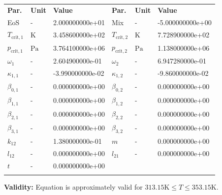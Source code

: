 \begin{longtable}[l]{lll|lll}
\toprule
\addlinespace
\textbf{Par.} & \textbf{Unit} & \textbf{Value} &	\textbf{Par.} & \textbf{Unit} & \textbf{Value} \\
\addlinespace
\midrule
\endhead

\bottomrule
\endfoot
\bottomrule
\endlastfoot
\addlinespace

EoS & - & 2.000000000e+01 & Mix & - & -5.000000000e+00 \\
$T_\mathrm{crit,1}$ & $\si{\kelvin}$ & 3.458600000e+02 & $T_\mathrm{crit,2}$ & $\si{\kelvin}$ & 7.728900000e+02 \\
$p_\mathrm{crit,1}$ & $\si{\pascal}$ & 3.764100000e+06 & $p_\mathrm{crit,2}$ & $\si{\pascal}$ & 1.138000000e+06 \\
$\omega_{1}$ & - & 2.604900000e-01 & $\omega_{2}$ & - & 6.947280000e-01 \\
$\kappa_{1,1}$ & - & -3.990000000e-02 & $\kappa_{1,2}$ & - & -9.860000000e-02 \\
$\beta_{0,1}$ & - & 0.000000000e+00 & $\beta_{0,2}$ & - & 0.000000000e+00 \\
$\beta_{1,1}$ & - & 0.000000000e+00 & $\beta_{1,2}$ & - & 0.000000000e+00 \\
$\beta_{2,1}$ & - & 0.000000000e+00 & $\beta_{2,2}$ & - & 0.000000000e+00 \\
$\beta_{3,1}$ & - & 0.000000000e+00 & $\beta_{3,2}$ & - & 0.000000000e+00 \\
$k_{12}$ & - & 1.380000000e-01 & $m$ & - & 0.000000000e+00 \\
$l_{12}$ & - & 0.000000000e+00 & $l_{21}$ & - & 0.000000000e+00 \\
$t$ & - & 0.000000000e+00 & & & \\

\addlinespace\end{longtable}

\textbf{Validity:}
\newline
Equation is approximately valid for $313.15 \si{\kelvin} \leq T \leq 353.15 \si{\kelvin}$.
\newline

